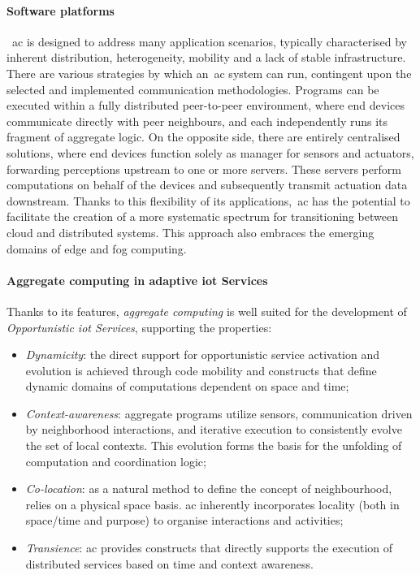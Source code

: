 \paragraph{Software platforms}
~\ac{ac} is designed to address many application scenarios, typically characterised by inherent distribution, heterogeneity,
mobility and a lack of stable infrastructure.
There are various strategies by which an~\ac{ac} system can run, contingent upon the selected and implemented
communication methodologies.
Programs can be executed within a fully distributed peer-to-peer environment, where end devices communicate directly
with peer neighbours, and each independently runs its fragment of aggregate logic.
On the opposite side, there are entirely centralised solutions, where end devices function solely as manager for sensors
and actuators, forwarding perceptions upstream to one or more servers.
These servers perform computations on behalf of the devices and subsequently transmit actuation data downstream.
Thanks to this flexibility of its applications,~\ac{ac} has the potential to facilitate the creation of a more systematic
spectrum for transitioning between cloud and distributed systems.
This approach also embraces the emerging domains of edge and fog computing.

\paragraph{Aggregate computing in adaptive \ac{iot} Services}
Thanks to its features, \emph{aggregate computing} is well suited for the development of \emph{Opportunistic \ac{iot}
Services}, supporting the properties:
\begin{itemize}
    \item \emph{Dynamicity}: the direct support for opportunistic service activation and evolution is achieved through
        code mobility and constructs that define dynamic domains of computations dependent on space and time;
    \item \emph{Context-awareness}: aggregate programs utilize sensors, communication driven by neighborhood interactions,
        and iterative execution to consistently evolve the set of local contexts.
        This evolution forms the basis for the unfolding of computation and coordination logic;
    \item \emph{Co-location}: as a natural method to define the concept of neighbourhood, relies on a physical space basis.
        \ac{ac} inherently incorporates locality (both in space/time and purpose) to organise interactions and activities;
    \item \emph{Transience}: \ac{ac} provides constructs that directly supports the execution of distributed services
        based on time and context awareness.
\end{itemize}

